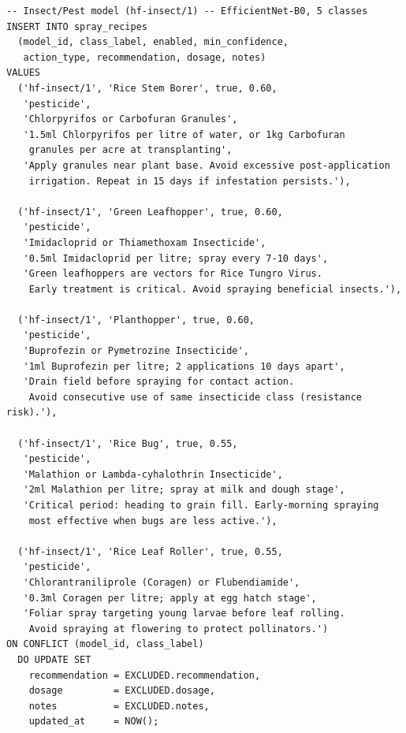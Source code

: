 \documentclass[12pt,a4paper]{report}
\begin{document}
\begin{lstlisting}[style=sql, caption={Spray recipes for EfficientNet-B0 Insect model --- 5 pest classes (0008\_master\_recipes.sql, excerpt)}]
-- Insect/Pest model (hf-insect/1) -- EfficientNet-B0, 5 classes
INSERT INTO spray_recipes
  (model_id, class_label, enabled, min_confidence,
   action_type, recommendation, dosage, notes)
VALUES
  ('hf-insect/1', 'Rice Stem Borer', true, 0.60,
   'pesticide',
   'Chlorpyrifos or Carbofuran Granules',
   '1.5ml Chlorpyrifos per litre of water, or 1kg Carbofuran
    granules per acre at transplanting',
   'Apply granules near plant base. Avoid excessive post-application
    irrigation. Repeat in 15 days if infestation persists.'),

  ('hf-insect/1', 'Green Leafhopper', true, 0.60,
   'pesticide',
   'Imidacloprid or Thiamethoxam Insecticide',
   '0.5ml Imidacloprid per litre; spray every 7-10 days',
   'Green leafhoppers are vectors for Rice Tungro Virus.
    Early treatment is critical. Avoid spraying beneficial insects.'),

  ('hf-insect/1', 'Planthopper', true, 0.60,
   'pesticide',
   'Buprofezin or Pymetrozine Insecticide',
   '1ml Buprofezin per litre; 2 applications 10 days apart',
   'Drain field before spraying for contact action.
    Avoid consecutive use of same insecticide class (resistance risk).'),

  ('hf-insect/1', 'Rice Bug', true, 0.55,
   'pesticide',
   'Malathion or Lambda-cyhalothrin Insecticide',
   '2ml Malathion per litre; spray at milk and dough stage',
   'Critical period: heading to grain fill. Early-morning spraying
    most effective when bugs are less active.'),

  ('hf-insect/1', 'Rice Leaf Roller', true, 0.55,
   'pesticide',
   'Chlorantraniliprole (Coragen) or Flubendiamide',
   '0.3ml Coragen per litre; apply at egg hatch stage',
   'Foliar spray targeting young larvae before leaf rolling.
    Avoid spraying at flowering to protect pollinators.')
ON CONFLICT (model_id, class_label)
  DO UPDATE SET
    recommendation = EXCLUDED.recommendation,
    dosage         = EXCLUDED.dosage,
    notes          = EXCLUDED.notes,
    updated_at     = NOW();
\end{lstlisting}

\end{document}
